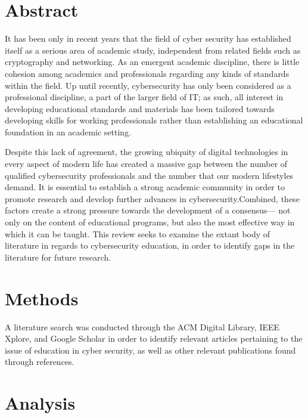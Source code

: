 \section{Abstract}

    It has been only in recent years that the field of cyber security has established itself as a serious area of academic study, independent from related fields such as cryptography and networking. %
As an emergent academic discipline, there is little cohesion among academics and professionals regarding any kinds of standards within the field. %
Up until recently, cybersecurity has only been considered as a professional discipline, a part of the larger field of IT; %
as such, all interest in developing educational standards and materials has been tailored towards developing skills for working professionals rather than establishing an educational foundation in an academic setting. 

    Despite this lack of agreement, the growing ubiquity of digital technologies in every aspect of modern life has created a massive gap between the number of qualified cybersecurity professionals and the number that our modern lifestyles demand. %
It is essential to establish a strong academic community in order to promote research and develop further advances in cybersecurity.Combined, these factors create a strong pressure towards the development of a consensus---%
not only on the content of educational programs, but also the most effective way in which it can be taught. %
This review seeks to examine the extant body of literature in regards to cybersecurity education, in order to identify gaps in the literature for future research.

\section{Methods}

    A literature search was conducted through the ACM Digital Library, IEEE Xplore, and Google Scholar in order to identify relevant articles pertaining to the issue of education in cyber security, as well as other relevant publications found through references.

\section{Analysis}

